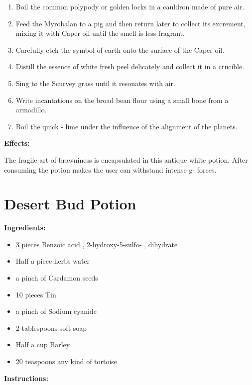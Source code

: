 \documentclass{article}
\begin{document}
\begin{enumerate}
  \item Boil the common polypody or golden locks in a cauldron made of pure air.
  \item Feed the Myrobalan to a pig and then return later to collect its excrement, mixing it with Caper oil until the smell is less fragrant.
  \item Carefully etch the symbol of earth onto the surface of the Caper oil.
  \item Distill the essence of white fresh peel delicately and collect it in a crucible.
  \item Sing to the Scurvey grass until it resonates with air.
  \item Write incantations on the broad bean flour using a small bone from a armadillo.
  \item Boil the quick - lime under the influence of the alignment of the planets.
\end{enumerate}

\textbf{Effects:}

The fragile art of brawniness is encapsulated in this antique white potion. After consuming the potion makes the user can withstand intense g- forces.

\newpage
\section*{Desert Bud Potion}

\textbf{Ingredients:}

\begin{itemize}
  \item 3 pieces Benzoic acid , 2-hydroxy-5-sulfo- , dihydrate
  \item Half a piece herbs water
  \item a pinch of Cardamon seeds
  \item 10 pieces Tin
  \item a pinch of Sodium cyanide
  \item 2 tablespoons soft soap
  \item Half a cup Barley
  \item 20 teaspoons any kind of tortoise
\end{itemize}

\textbf{Instructions:}
\end{document}
